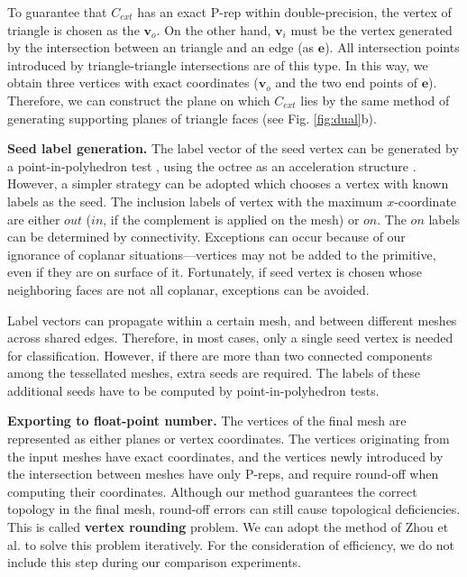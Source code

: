 To guarantee that $C_{ext}$ has an exact P-rep within double-precision, the vertex of triangle is chosen as the $\bm{v}_o$. On the other hand, $\bm{v}_i$ must be the vertex generated by the intersection between an triangle and an edge (as $\bm{e}$). All intersection points introduced by triangle-triangle intersections are of this type. In this way, we obtain three vertices with exact coordinates ($\bm{v}_o$ and the two end points of $\bm{e}$). Therefore, we can construct the plane on which $C_{ext}$ lies by the same method of generating supporting planes of triangle faces (see Fig. \ref{fig:dual}b).

\vspace{0.5em}
\noindent\textbf{Seed label generation. }
The label vector of the seed vertex can be generated by a point-in-polyhedron test \cite{ogayar2005point}, using the octree as an acceleration structure \cite{frisken2002simple}. However, a simpler strategy can be adopted which chooses a vertex with known labels as the seed. The inclusion labels of vertex with the maximum $x$-coordinate are either $out$ ($in$, if the complement is applied on the mesh) or $on$. The $on$ labels can be determined by connectivity. Exceptions can occur because of our ignorance of coplanar situations---vertices may not be added to the primitive, even if they are on surface of it. Fortunately, if seed vertex is chosen whose neighboring faces are not all coplanar, exceptions can be avoided.

Label vectors can propagate within a certain mesh, and between different meshes across shared edges. Therefore, in most cases, only a single seed vertex is needed for classification. However, if there are more than two connected components among the tessellated meshes, extra seeds are required. The labels of these additional seeds have to be computed by point-in-polyhedron tests.

\vspace{0.5em}
\noindent\textbf{Exporting to float-point number. }
The vertices of the final mesh are represented as either planes or vertex coordinates. The vertices originating from the input meshes have exact coordinates, and the vertices newly introduced by the intersection between meshes have only P-reps, and require round-off when computing their coordinates. Although our method guarantees the correct topology in the final mesh, round-off errors can still cause topological deficiencies. This is called \textbf{vertex rounding} problem. We can adopt the method of Zhou et al. \cite{zhou2016mesh} to solve this problem iteratively. For the consideration of efficiency, we do not include this step during our comparison experiments.

